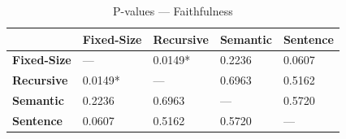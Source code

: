 \begin{table}
\caption{P-values — Faithfulness}
\label{tab:pvalues_faithfulness}
\begin{tabular}{lllll}
\toprule
 & Fixed-Size & Recursive & Semantic & Sentence \\
\midrule
\textbf{Fixed-Size} & — & 0.0149* & 0.2236 & 0.0607 \\
\textbf{Recursive} & 0.0149* & — & 0.6963 & 0.5162 \\
\textbf{Semantic} & 0.2236 & 0.6963 & — & 0.5720 \\
\textbf{Sentence} & 0.0607 & 0.5162 & 0.5720 & — \\
\bottomrule
\end{tabular}
\end{table}
